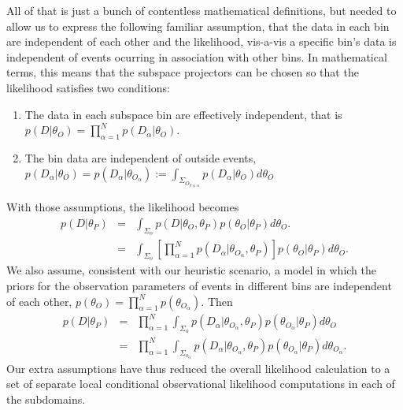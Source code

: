 \documentclass[twocolumn,showpacs,aps,prd,nobibnotes,nofootinbib,floatfix]{revtex4-1}
\begin{document}
All of that is just a bunch of contentless mathematical definitions, but needed to allow us to express the following familiar assumption, that the data in each bin are independent of each other and the likelihood, vis-a-vis a specific bin's data is independent of events ocurring in association with other bins.  In mathematical terms, this means that the subspace projectors can be chosen so that the likelihood satisfies two conditions:
\begin{enumerate}
\item The data in each subspace bin are effectively independent, that is $p(D|\theta_O)=\prod_{\alpha=1}^Np(D_\alpha|\theta_O)$.
\item The bin data are independent of outside events, $p(D_\alpha|\theta_O)=p(D_\alpha|\theta_{O_\alpha}):=\int_{\Sigma_{O_{\beta\neq\alpha}}}{p(D_\alpha|\theta_O)d\theta_O}$
\end{enumerate}
With those assumptions, the likelihood becomes
\begin{eqnarray}
  p(D|\theta_P)&=&\int_{\Sigma_o} p(D|\theta_O,\theta_P)p(\theta_O|\theta_P)d\theta_O.\\
  &=&\int_{\Sigma_o} \left[\prod_{\alpha=1}^Np(D_\alpha|\theta_{O_\alpha},\theta_P)\right]p(\theta_O|\theta_P)d\theta_O.
\end{eqnarray}
We also assume, consistent with our heuristic scenario, a model in which the priors for the observation parameters of events in different bins are independent of each other, $p(\theta_{O})=\prod_{\alpha{=}1}^Np(\theta_{O_\alpha})$. Then
\begin{eqnarray}
  p(D|\theta_P)&=&\prod_{\alpha=1}^N\int_{\Sigma_o} p(D_\alpha|\theta_{O_\alpha},\theta_P) p(\theta_{O_\alpha}|\theta_P)d\theta_O \\ 
  &=&\prod_{\alpha=1}^N\int_{\Sigma_{o_\alpha}} p(D_\alpha|\theta_{O_\alpha},\theta_P) p(\theta_{O_\alpha}|\theta_P)d\theta_{O_\alpha}.
\end{eqnarray}
Our extra assumptions have thus reduced the overall likelihood calculation to a set of separate local conditional observational likelihood computations in each of the subdomains. 
\end{document}
